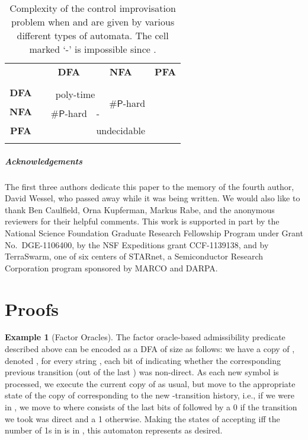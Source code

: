 \documentclass[a4paper,USenglish,numberwithinsect]{lipics}
\theoremstyle{plain}
\theoremstyle{definition}
\newtheorem{example-indexed-by-theorem}[theorem]{Example}
\newcommand{\sharpP}{\ensuremath{\mathsf{\# P}}}
\begin{document}
\setlength{\tabcolsep}{5pt}
\renewcommand{\arraystretch}{1.2}
\begin{table}[tb]
\begin{center}
\begin{tabular}{cr||c|c|c|c|}
 &  & \textbf{DFA} & \multicolumn{2}{|c|}{\textbf{NFA}} & \textbf{PFA} \\
 &  &  &  &  &  \\
\hline
\hline
\textbf{DFA} &  & \multicolumn{2}{c|}{\multirow{2}{*}{poly-time}} & \multirow{3}{*}{\sharpP-hard} & \multirow{4}{*}{} \\
\cline{1-2}
\multirow{2}{*}{\textbf{NFA}} &  & \multicolumn{2}{c|}{} & &  \\
\cline{2-4}
&  & \sharpP-hard & - &   &  \\
\cline{1-5}
\textbf{PFA} &  & \multicolumn{4}{r|}{undecidable} \\
\hline \\
\end{tabular}
\caption{Complexity of the control improvisation problem when  and  are given by various different types of automata. The cell marked `-' is impossible since .}
\label{table:complexities}
\end{center}
\label{defaulttable}
\end{table}

\subparagraph*{Acknowledgements}
The first three authors dedicate this paper to the memory of the fourth author, David Wessel, who passed away while it was being written.
We would also like to thank Ben Caulfield, Orna Kupferman, Markus Rabe, and the anonymous reviewers for their helpful comments.
This work is supported in part by the National Science Foundation Graduate Research Fellowship Program 
under Grant No.~DGE-1106400, by the NSF Expeditions grant CCF-1139138, and 
by TerraSwarm, one of six centers of STARnet, a Semiconductor Research Corporation program sponsored by MARCO and DARPA.




\appendix

\section{Proofs}

\setcounter{section}{4}
\begin{example-indexed-by-theorem}[Factor Oracles]
The factor oracle-based admissibility predicate  described above can be encoded as a DFA of size  as follows: we have a copy of , denoted , for every string , each bit of  indicating whether the corresponding previous transition (out of the last ) was non-direct. As each new symbol is processed, we execute the current copy of  as usual, but move to the appropriate state of the copy of  corresponding to the new -transition history, i.e., if we were in , we move to  where  consists of the last  bits of  followed by a 0 if the transition we took was direct and a 1 otherwise. Making the states of  accepting iff the number of 1s in  is in , this automaton represents  as desired.
\end{example-indexed-by-theorem}
\end{document}
